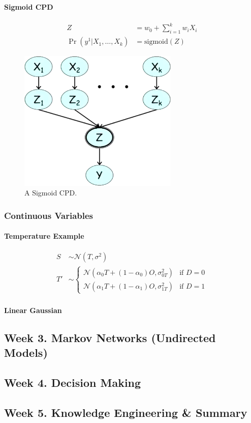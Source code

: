 \documentclass[12pt]{article}
\begin{document}
\paragraph{Sigmoid CPD}

\begin{align*}
  Z & = w_0 + \sum_{i=1}^k w_i X_i \\
  \Pr(y^1 | X_1, \ldots, X_k) & = \text{sigmoid}(Z)
\end{align*}

\begin{figure}[H]
\centering
\includegraphics[width=3in]{graphics/sigmoid_cpd.png}
\caption{A Sigmoid CPD.}
\label{fig:sigmoid_cpd}
\end{figure}


\subsubsection{Continuous Variables}

\paragraph{Temperature Example}
\begin{align*}
  S & \sim \mathcal{N}(T, \sigma^2) \\
  T' & \sim 
    \begin{cases}
      \mathcal{N}(\alpha_0 T + (1-\alpha_0)O, \sigma_{0T}^2) & \text{if } D = 0 \\
      \mathcal{N}(\alpha_1 T + (1-\alpha_1)O, \sigma_{1T}^2) & \text{if } D = 1
    \end{cases}
\end{align*}

\paragraph{Linear Gaussian}


\subsection{Week 3. Markov Networks (Undirected Models)}


\subsection{Week 4. Decision Making}


\subsection{Week 5. Knowledge Engineering \& Summary}
\end{document}
